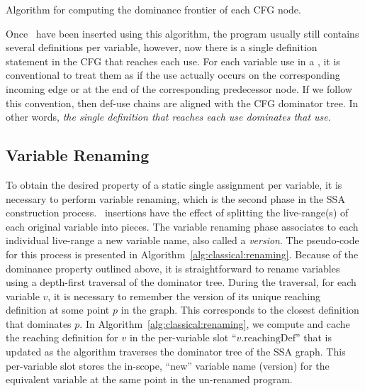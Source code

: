 {\begin{algorithm}
\caption{\label{alg:classical_construction:df}Algorithm for computing the 
dominance frontier of each CFG node.}
\end{algorithm}



Once \phifuns\ have been inserted using this algorithm, the program usually
still contains several definitions per variable, however, now there is a
single definition statement in the CFG that reaches each use.  
For each variable use in a \phifun, it is conventional to treat them as if the 
use actually occurs on the corresponding incoming edge or at the end of the
corresponding predecessor node.
If we follow this convention,  
then def-use chains are aligned with the CFG dominator tree.
In other words,
\emph{the single definition that reaches each use dominates that use}.

\subsection{Variable Renaming}
\newcommand\reachingDef[1]{#1.\mathrm{reachingDef}}
To obtain the desired property of a static single assignment per variable,
it is necessary to perform variable renaming, which
is the second phase in the SSA construction process.
\phifun\ insertions have the effect of splitting the live-range(s) of
each original variable into pieces. The variable renaming phase
associates to each individual live-range a new variable name, also
called a \emph{version}.
The pseudo-code for this process is presented in 
Algorithm~\ref{alg:classical:renaming}.
Because of the dominance property outlined above,
it is straightforward to rename variables
using a depth-first traversal of the dominator tree.
During the traversal, for each variable $v$, it is necessary to
remember the version of its unique reaching definition at some point $p$ in
the graph. This corresponds to the closest definition that dominates $p$.
In Algorithm~\ref{alg:classical:renaming}, we compute and cache the 
reaching definition for $v$ in the per-variable slot ``$\reachingDef{v}$''
that is updated as the algorithm traverses the dominator tree of the
SSA graph.
This per-variable slot 
stores the in-scope, ``new'' variable name (version) for the equivalent
variable at the same point in the un-renamed program.

}
